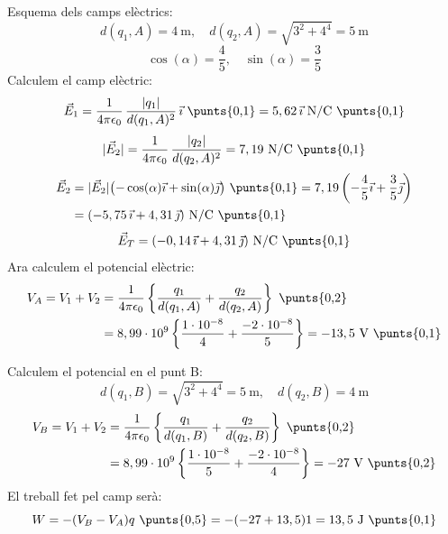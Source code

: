 \begin{solapartat}
Esquema dels camps elèctrics: 
\[ d(q_1, A) = 4\ \mathrm{m},\quad d(q_2, A) = \sqrt{3^2 + 4^4} = 5\ \mathrm{m} \]
\[ \cos(\alpha) = \frac{4}{5},\quad \sin(\alpha) = \frac{3}{5} \]
Calculem el camp elèctric:
\[ \vec{E}_1 = \frac{1}{4\pi\epsilon_0}\,\frac{|q_1|}{d(q_1, A)^2}\,\vec{\imath} \ \text{\punts{0,1}} = 5,62\,\vec{\imath}\ \mathrm{N/C} \ \text{\punts{0,1}} \]
\[ |\vec{E}_2| = \frac{1}{4\pi\epsilon_0}\,\frac{|q_2|}{d(q_2, A)^2} = 7,19\ \mathrm{N/C} \ \text{\punts{0,1}} \]
\begin{align*}
\vec{E}_2 &= |\vec{E}_2|\bigl(-\cos(\alpha)\vec{\imath} + \sin(\alpha)\vec{\jmath}\bigr) \ \text{\punts{0,1}} = 7,19\left(-\frac{4}{5}\vec{\imath} + \frac{3}{5}\vec{\jmath}\right)\\
&= (-5,75\,\vec{\imath} + 4,31\,\vec{\jmath})\ \mathrm{N/C} \ \text{\punts{0,1}}
\end{align*}
\[ \vec{E}_T = (-0,14\,\vec{\imath} + 4,31\,\vec{\jmath})\ \mathrm{N/C} \ \text{\punts{0,1}} \]
Ara calculem el potencial elèctric:
\begin{align*}
V_A = V_1 + V_2 &= \frac{1}{4\pi\epsilon_0}\left\{\frac{q_1}{d(q_1, A)} + \frac{q_2}{d(q_2, A)}\right\} \ \text{\punts{0,2}}\\
&= 8,99\cdot 10^{9}\left\{\frac{1\cdot 10^{-8}}{4} + \frac{-2\cdot 10^{-8}}{5}\right\} = -13,5\ \mathrm{V} \ \text{\punts{0,1}}
\end{align*}
\end{solapartat}

\begin{solapartat}
Calculem el potencial en el punt B:
\[ d(q_1, B) = \sqrt{3^2 + 4^4} = 5\ \mathrm{m},\quad d(q_2, B) = 4\ \mathrm{m} \]
\begin{align*}
V_B = V_1 + V_2 &= \frac{1}{4\pi\epsilon_0}\left\{\frac{q_1}{d(q_1, B)} + \frac{q_2}{d(q_2, B)}\right\} \ \text{\punts{0,2}}\\
&= 8,99\cdot 10^{9}\left\{\frac{1\cdot 10^{-8}}{5} + \frac{-2\cdot 10^{-8}}{4}\right\} = -27\ \mathrm{V} \ \text{\punts{0,2}}
\end{align*}
El treball fet pel camp serà:
\[ W = -(V_B - V_A)q \ \text{\punts{0,5}} = -(-27 + 13,5)1 = 13,5\ \mathrm{J} \ \text{\punts{0,1}} \]
\end{solapartat}

